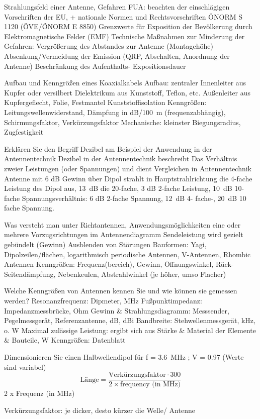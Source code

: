 \documentclass[avery5371,grid,frame,a4paper]{flashcards}
\newcommand{\card}[3]{
  \begin{flashcard}[{\chap} -- #1]{#2}#3\end{flashcard}
}
\begin{document}
\card{73}{Strahlungsfeld einer Antenne, Gefahren}{
  FUA:   beachten der einschlägigen Vorschriften
der EU, + nationale Normen und Rechtsvorschriften
ÖNORM S 1120 (ÖVE/ÖNORM E 8850)
Grenzwerte für Exposition der Bevölkerung durch
Elektromagnetische Felder (EMF)
Technische Maßnahmen zur Minderung der Gefahren:
Vergrößerung des Abstandes zur Antenne
(Montagehöhe)
Absenkung/Vermeidung der Emission (QRP, Abschalten, 
Anordnung der Antenne)
Beschränkung des Aufenthalts- Expositionsdauer
}
\card{74}{Aufbau und Kenngrößen eines Koaxialkabels}{
  Aufbau: zentraler Innenleiter aus Kupfer oder versilbert 
Dielektrikum aus Kunststoff, Teflon, etc.
Außenleiter aus Kupfergeflecht, Folie, Festmantel
Kunststoffisolation
Kenngrößen: Leitungswellenwiderstand,
Dämpfung in dB/\SI{100}{\metre} (frequenzabhängig),
Schirmungsfaktor, Verkürzungsfaktor 
Mechanische: kleinster Biegungsradius, 
Zugfestigkeit
}
\card{75}{Erklären Sie den Begriff Dezibel am Beispiel der Anwendung in der Antennentechnik}{
  Dezibel in der Antennentechnik beschreibt
Das Verhältnis zweier Leistungen (oder Spannungen)
und dient Vergleichen in Antennentechnik
Antenne mit 6 dB Gewinn über Dipol strahlt in
Hauptstrahlrichtung die 4-fache Leistung des 
Dipol aus, \SI{13}{\dB} die 20-fache, 3 dB 2-fache
Leistung, \SI{10}{\dB} 10-fache 
Spannungsverhältnis:
6 dB 2-fache Spannung, \SI{12}{\dB} 4- fache-, \SI{20}{\dB}
10 fache Spannung.
}
\card{76}{Was versteht man unter Richtantennen, Anwendungsmöglichkeiten}{
  eine oder mehrere Vorzugsrichtungen im
Antennendiagramm 
Sendeleistung wird  gezielt gebündelt (Gewinn)
Ausblenden von Störungen
Bauformen: Yagi, Dipolzeilen/flächen, 
logarithmisch periodische Antennen, V-Antennen,
Rhombic Antennen
Kenngrößen: Frequenz(bereich), Gewinn, 
Öffnungswinkel, Rück- Seitendämpfung,
Nebenkeulen, Abstrahlwinkel (je höher, umso
Flacher)
}
\card{77}{Welche Kenngrößen von Antennen kennen Sie und wie können sie gemessen werden?}{
  Resonanzfrequenz: Dipmeter,  MHz
Fußpunktimpedanz: Impedanzmessbrücke,  Ohm
Gewinn \& Strahlungsdiagramm: Messsender, 
Pegelmessgerät, Referenzantenne,   dB, dBi
Bandbreite: Stehwellenmessgerät,   kHz, o. W
Maximal zulässige Leistung: ergibt sich aus 
Stärke \& Material der Elemente \& Bauteile, W
Kenngrößen: Datenblatt
}
\card{78}{Dimensionieren Sie einen Halbwellendipol für f = \SI{3.6}{\mega\Hz} ; V = 0.97 (Werte sind variabel)}{
  \[
    \text{Länge} = \frac{\text{Verkürzungsfaktor}\cdot 300}{2 \times \text{frequency (in MHz)}}
  \]
              2 x Frequenz (in MHz)

Verkürzungsfaktor: je dicker, desto kürzer die Welle/ Antenne
}
\end{document}
